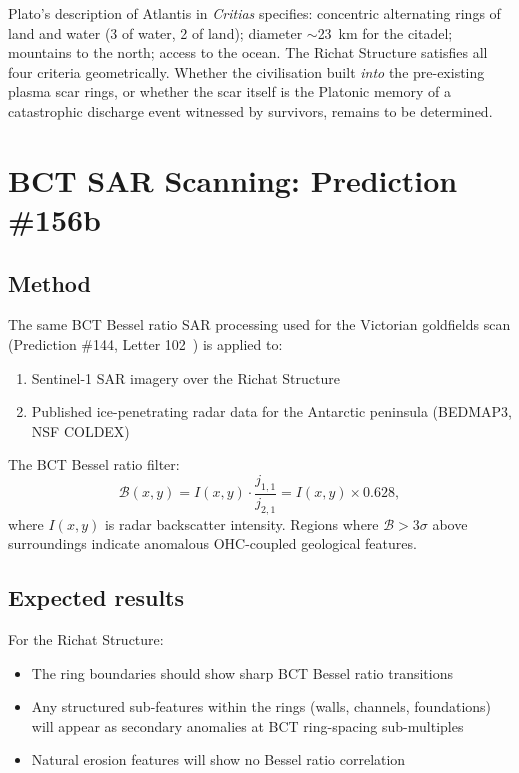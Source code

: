 \documentclass[12pt,twocolumn]{article}
\begin{document}
Plato's description of Atlantis in \textit{Critias} specifies:
concentric alternating rings of land and water (3 of water,
2 of land); diameter $\sim$23~km for the citadel;
mountains to the north; access to the ocean. The Richat
Structure satisfies all four criteria geometrically. Whether
the civilisation built \textit{into} the pre-existing plasma
scar rings, or whether the scar itself is the Platonic
memory of a catastrophic discharge event witnessed by
survivors, remains to be determined.

\section{BCT SAR Scanning: Prediction \#156b}

\subsection{Method}

The same BCT Bessel ratio SAR processing used for the
Victorian goldfields scan (Prediction \#144,
Letter 102~\cite{BCT_L102}) is applied to:
\begin{enumerate}
\item Sentinel-1 SAR imagery over the Richat Structure
\item Published ice-penetrating radar data for the
Antarctic peninsula (BEDMAP3, NSF COLDEX)
\end{enumerate}

The BCT Bessel ratio filter:
\begin{equation}
\mathcal{B}(x,y)=I(x,y)\cdot\frac{j_{1,1}}{j_{2,1}}
=I(x,y)\times0.628,
\end{equation}
where $I(x,y)$ is radar backscatter intensity. Regions
where $\mathcal{B}>3\sigma$ above surroundings indicate
anomalous OHC-coupled geological features.

\subsection{Expected results}

For the Richat Structure:
\begin{itemize}
\item The ring boundaries should show sharp BCT Bessel
ratio transitions
\item Any structured sub-features within the rings
(walls, channels, foundations) will appear as
secondary anomalies at BCT ring-spacing sub-multiples
\item Natural erosion features will show no Bessel ratio
correlation
\end{itemize}
\end{document}
